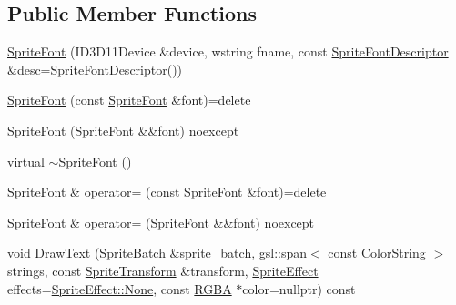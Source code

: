 \subsection*{Public Member Functions}
\begin{DoxyCompactItemize}
\item 
\mbox{\hyperlink{classmage_1_1rendering_1_1_sprite_font_a6080794a32e8e4fa4b2be7392a4e9466}{Sprite\+Font}} (I\+D3\+D11\+Device \&device, wstring fname, const \mbox{\hyperlink{classmage_1_1rendering_1_1_sprite_font_descriptor}{Sprite\+Font\+Descriptor}} \&desc=\mbox{\hyperlink{classmage_1_1rendering_1_1_sprite_font_descriptor}{Sprite\+Font\+Descriptor}}())
\item 
\mbox{\hyperlink{classmage_1_1rendering_1_1_sprite_font_a80cfc8c939ee3709f7a6f9441a5bd688}{Sprite\+Font}} (const \mbox{\hyperlink{classmage_1_1rendering_1_1_sprite_font}{Sprite\+Font}} \&font)=delete
\item 
\mbox{\hyperlink{classmage_1_1rendering_1_1_sprite_font_a9a2014908c6c63aa9d9ad223383bd03a}{Sprite\+Font}} (\mbox{\hyperlink{classmage_1_1rendering_1_1_sprite_font}{Sprite\+Font}} \&\&font) noexcept
\item 
virtual \mbox{\hyperlink{classmage_1_1rendering_1_1_sprite_font_a51ec0418e1456d7634c6540ccc801644}{$\sim$\+Sprite\+Font}} ()
\item 
\mbox{\hyperlink{classmage_1_1rendering_1_1_sprite_font}{Sprite\+Font}} \& \mbox{\hyperlink{classmage_1_1rendering_1_1_sprite_font_a3d0054493b983437a392c807523d744e}{operator=}} (const \mbox{\hyperlink{classmage_1_1rendering_1_1_sprite_font}{Sprite\+Font}} \&font)=delete
\item 
\mbox{\hyperlink{classmage_1_1rendering_1_1_sprite_font}{Sprite\+Font}} \& \mbox{\hyperlink{classmage_1_1rendering_1_1_sprite_font_a95317d173b64565c6cba865ca524fe2f}{operator=}} (\mbox{\hyperlink{classmage_1_1rendering_1_1_sprite_font}{Sprite\+Font}} \&\&font) noexcept
\item 
void \mbox{\hyperlink{classmage_1_1rendering_1_1_sprite_font_a0be6671c77a11df1e11a7a1568caeb68}{Draw\+Text}} (\mbox{\hyperlink{classmage_1_1rendering_1_1_sprite_batch}{Sprite\+Batch}} \&sprite\+\_\+batch, gsl\+::span$<$ const \mbox{\hyperlink{classmage_1_1rendering_1_1_color_string}{Color\+String}} $>$ strings, const \mbox{\hyperlink{classmage_1_1_sprite_transform}{Sprite\+Transform}} \&transform, \mbox{\hyperlink{namespacemage_1_1rendering_a4dbc3536c87b906f1d41d863ec458e78}{Sprite\+Effect}} effects=\mbox{\hyperlink{namespacemage_1_1rendering_a4dbc3536c87b906f1d41d863ec458e78a6adf97f83acf6453d4a6a4b1070f3754}{Sprite\+Effect\+::\+None}}, const \mbox{\hyperlink{structmage_1_1_r_g_b_a}{R\+G\+BA}} $\ast$color=nullptr) const

\end{DoxyCompactItemize}
